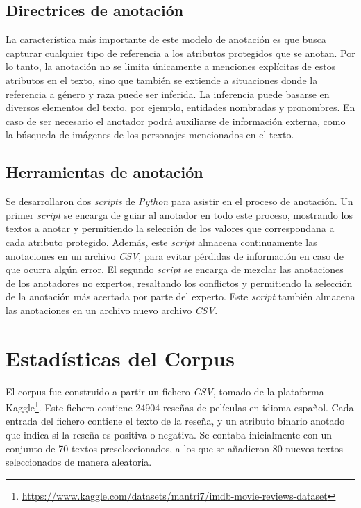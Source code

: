 \subsection{Directrices de anotaci\'on}\label{section:annotation_guidelines}
La caracter\'istica m\'as importante de este modelo de anotaci\'on es que busca capturar cualquier tipo de referencia a los atributos 
protegidos que se anotan. Por lo tanto, la anotaci\'on no se limita \'unicamente a menciones expl\'icitas de estos atributos en el 
texto, sino que tambi\'en se extiende a situaciones donde la referencia a g\'enero y raza puede ser inferida. La inferencia puede 
basarse en diversos elementos del texto, por ejemplo, entidades nombradas y pronombres. En caso de ser necesario el anotador podr\'a
auxiliarse de informaci\'on externa, como la b\'usqueda de im\'agenes de los personajes mencionados en el texto.

\subsection{Herramientas de anotaci\'on}
Se desarrollaron dos \emph{scripts} de \emph{Python} para asistir en el proceso de anotaci\'on. Un primer \emph{script}
se encarga de guiar al anotador en todo este proceso, mostrando los textos a anotar y permitiendo la selecci\'on de los valores
que correspondana a cada atributo protegido. Adem\'as, este \emph{script} almacena continuamente las anotaciones en un archivo
\emph{CSV}, para evitar p\'erdidas de informaci\'on en caso de que ocurra alg\'un error. El segundo \emph{script} se encarga de
mezclar las anotaciones de los anotadores no expertos, resaltando los conflictos y permitiendo la selecci\'on de la anotaci\'on
m\'as acertada por parte del experto. Este \emph{script} tambi\'en almacena las anotaciones en un archivo nuevo archivo
\emph{CSV}.

\section{Estad\'isticas del Corpus}
El corpus fue construido a partir un fichero \emph{CSV}, tomado de la plataforma 
Kaggle\footnote{\url{https://www.kaggle.com/datasets/mantri7/imdb-movie-reviews-dataset}}. 
Este fichero contiene 24904 rese\~nas de pel\'iculas en idioma espa\~nol. Cada entrada del fichero contiene el texto de la rese\~na, 
y un atributo binario anotado que indica si la rese\~na es positiva o negativa. Se contaba inicialmente con un conjunto de 70 textos 
preseleccionados, a los que se a\~nadieron 80 nuevos textos seleccionados de manera aleatoria.

